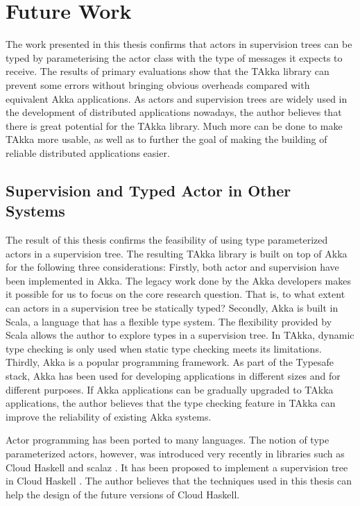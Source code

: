 \section{Future Work}
\label{future_work}

The work presented in this thesis confirms that actors in supervision trees can
be typed by parameterising the actor class with the type of messages it expects
to receive. The results of primary evaluations show that the TAkka library 
can prevent some errors without bringing obvious overheads compared with 
equivalent Akka applications. As actors and supervision trees are widely used 
in the development of distributed applications nowadays, the author believes 
that there is great potential for the TAkka library. Much more can be done to 
make TAkka more usable, as well as to further the goal of making the building 
of reliable distributed applications easier.


\subsection{Supervision and Typed Actor in Other Systems}

The result of this thesis confirms the feasibility of using type parameterized 
actors in a supervision tree.  The resulting TAkka library is built on top of 
Akka for the following three considerations:  Firstly, both actor and 
supervision have been implemented in Akka.  The legacy work done by the Akka 
developers makes it possible for us to focus on the core research question. 
That is, to what extent can actors in a supervision tree be statically typed?  
Secondly, Akka is 
built in Scala, a language that has a flexible type system.  The flexibility 
provided by Scala allows the author to explore types in a supervision tree.  In 
TAkka, dynamic type checking is only used when static type checking meets its 
limitations. Thirdly, Akka is a popular programming framework.  As part of the 
Typesafe stack, Akka has been used for developing applications in different 
sizes and for different purposes.  If Akka applications can be gradually 
upgraded to TAkka applications, the author believes that the type checking 
feature in TAkka can improve the reliability of existing Akka systems.

Actor programming has been ported to many languages.  The notion of type 
parameterized actors, however, was introduced very recently in libraries such 
as Cloud Haskell \citep{CloudHaskell} and scalaz \citep{scalaz}.  It has been 
proposed to implement a supervision tree in Cloud Haskell 
\citep{OTPCloudHaskell}.  The author believes that the techniques used in this 
thesis can help the design of the future versions of Cloud Haskell.



